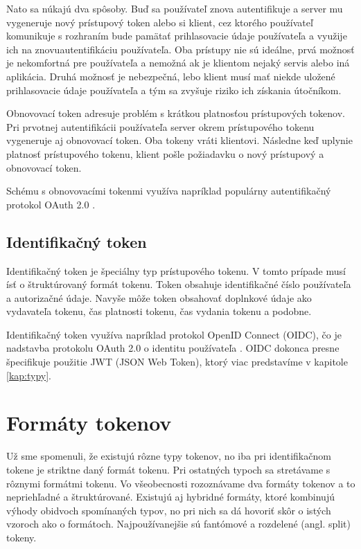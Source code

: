 Nato sa núkajú dva spôsoby. Buď sa používateľ znova autentifikuje a server mu vygeneruje nový prístupový token alebo si klient, cez ktorého používateľ komunikuje s rozhraním bude pamätať prihlasovacie údaje používateľa a využije ich na znovuautentifikáciu používateľa. Oba prístupy nie sú ideálne, prvá možnosť je nekomfortná pre používateľa a nemožná ak je klientom nejaký servis alebo iná aplikácia. Druhá možnosť je nebezpečná, lebo klient musí mať niekde uložené prihlasovacie údaje používateľa a tým sa zvyšuje riziko ich získania útočníkom.

Obnovovací token adresuje problém s krátkou platnosťou prístupových tokenov. Pri prvotnej autentifikácii používateľa server okrem prístupového tokenu vygeneruje aj obnovovací token. Oba tokeny vráti klientovi. Následne keď uplynie platnosť prístupového tokenu, klient pošle požiadavku o nový prístupový a obnovovací token. 

Schému s obnovovacími tokenmi využíva napríklad populárny autentifikačný protokol OAuth 2.0 \cite{oauth2}.


\subsection{Identifikačný token}

Identifikačný token je špeciálny typ prístupového tokenu. V tomto prípade musí ísť o štruktúrovaný formát tokenu. Token obsahuje identifikačné číslo používateľa a autorizačné údaje. Navyše môže token obsahovať doplnkové údaje ako vydavateľa tokenu, čas platnosti tokenu, čas vydania tokenu a podobne.

Identifikačný token využíva napríklad protokol OpenID Connect (OIDC), čo je nadstavba protokolu OAuth 2.0 o identitu používateľa \cite{oidc}. OIDC dokonca presne špecifikuje použitie JWT (JSON Web Token), ktorý viac predstavíme v kapitole \ref{kap:typy}.


\section{Formáty tokenov}
\label{sec:formats}

Už sme spomenuli, že existujú rôzne typy tokenov, no iba pri identifikačnom tokene je striktne daný formát tokenu. Pri ostatných typoch sa stretávame s rôznymi formátmi tokenu. Vo všeobecnosti rozoznávame dva formáty tokenov a to nepriehľadné a štruktúrované. Existujú aj hybridné formáty, ktoré kombinujú výhody obidvoch spomínaných typov, no pri nich sa dá hovoriť skôr o istých vzoroch ako o formátoch. Najpoužívanejšie sú fantómové a rozdelené (angl. split) tokeny. 

